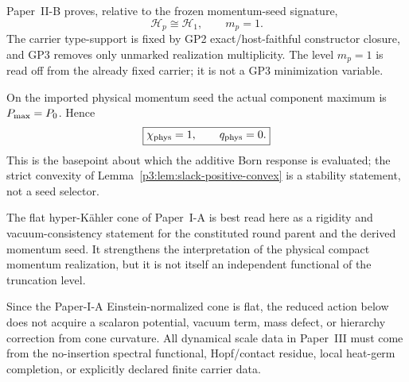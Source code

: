 \documentclass[12pt,a4paper]{article}
\begin{document}
\begin{theorem}
\label{p3:thm:factor-local-momentum-shape}
\label{p3:thm:factor-local-momentum-m1}
\label{p3:prop:constitutive-minimization-Dcl}
\label{p3:thm:truncation_m1}
\label{p3:thm:minimal-momentum-carrier}
\label{p3:thm:paper-i-series-selected-cell-closure}
Paper~II-B proves, relative to the frozen momentum-seed signature,
\[
 \boxed{\mathcal H_p\cong\mathcal H_1,\qquad m_p=1.}
\]
The carrier type-support is fixed by GP2 exact/host-faithful constructor
closure, and GP3 removes only unmarked realization multiplicity.  The level
\(m_p=1\) is read off from the already fixed carrier; it is not a GP3
minimization variable.
\end{theorem}

\begin{corollary}
\label{p3:thm:unique-cell-selfdual}
\label{p3:cor:selfdual-implies-sharp-saturation}
On the imported physical momentum seed the actual component maximum is
\(P_{\mathrm{max}}=P_{0}\).  Hence
\[
 \boxed{\chi_{\rm phys}=1,\qquad q_{\rm phys}=0.}
\]
This is the basepoint about which the additive Born response is evaluated; the
strict convexity of Lemma~\ref{p3:lem:slack-positive-convex} is a stability
statement, not a seed selector.
\end{corollary}

\begin{remark}
\label{p3:rem:flat-cone-m1}
The flat hyper-K\"ahler cone of Paper~I-A is best read here as a rigidity and vacuum-consistency
statement for the constituted round parent and the derived momentum seed. It strengthens the interpretation of the
physical compact momentum realization, but it is not itself an independent functional of the
truncation level.
\end{remark}


\begin{remark}
\label{p3:rem:flat-cone-no-dynamical-source}
Since the Paper-I-A Einstein-normalized cone is flat, the reduced action below does
not acquire a scalaron potential, vacuum term, mass defect, or hierarchy
correction from cone curvature.  All dynamical scale data in Paper~III must come
from the no-insertion spectral functional, Hopf/contact residue, local heat-germ
completion, or explicitly declared finite carrier data.
\end{remark}
\end{document}

